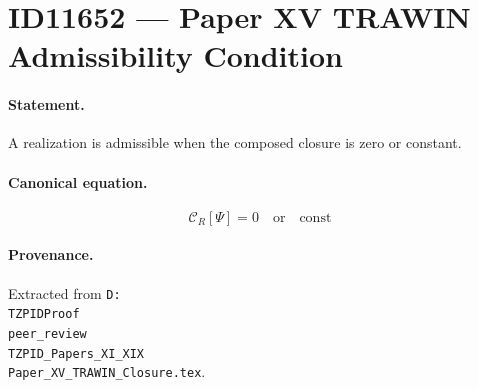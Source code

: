 \section*{ID11652 --- Paper XV TRAWIN Admissibility Condition}

\paragraph{Statement.}
A realization is admissible when the composed closure is zero or constant.

\paragraph{Canonical equation.}
\[
\mathcal{C}_R[\Psi]=0\quad\mathrm{or}\quad\mathrm{const}
\]

\paragraph{Provenance.}
Extracted from \texttt{D:\\TZPIDProof\\peer\_review\\TZPID\_Papers\_XI\_XIX\\Paper\_XV\_TRAWIN\_Closure.tex}.
